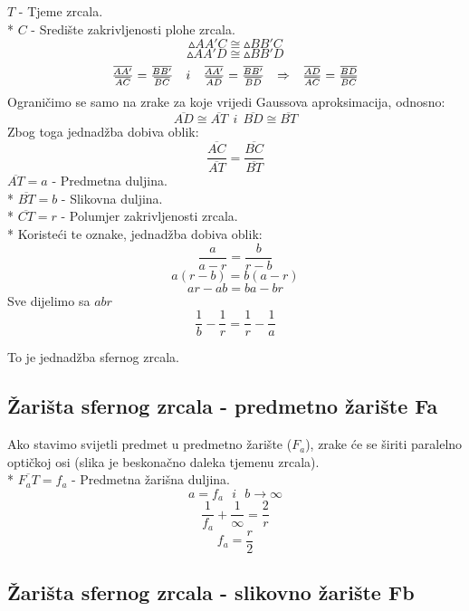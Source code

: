 \documentclass{report}
\begin{document}
{\noindent $T$ - Tjeme zrcala.\\*
$C$ - Središte zakrivljenosti plohe zrcala.
$$\vartriangle AA'C \cong \vartriangle BB'C$$
$$\vartriangle AA'D \cong \vartriangle BB'D$$
$$\begin{array}{*{20}c}
   {\frac{{\overline {AA'} }}
{{\overline {AC} }} = \frac{{\overline {BB'} }}
{{\overline {BC} }}} \hfill & i \hfill & {\frac{{\overline {AA'} }}
{{\overline {AD} }} = \frac{{\overline {BB'} }}
{{\overline {BD} }}} \hfill &  \Rightarrow  \hfill & {\frac{{\overline {AD} }}
{{\overline {AC} }} = \frac{{\overline {BD} }}
{{\overline {BC} }}} \hfill  \\

 \end{array} $$
Ograničimo se samo na zrake za koje vrijedi Gaussova aproksimacija, odnosno:
$$\overline{AD} \cong \overline{AT} \ \ i \ \ \overline{BD} \cong \overline{BT}$$
Zbog toga jednadžba dobiva oblik:
$$\frac{\overline{AC}}{\overline{AT}} = \frac{\overline{BC}}{\overline{BT}}$$
$\overline{AT} = a$ - Predmetna duljina.\\*
$\overline{BT} = b$ - Slikovna duljina.\\*
$\overline{CT} = r$ - Polumjer zakrivljenosti zrcala.\\*
Koristeći te oznake, jednadžba dobiva oblik:
$$\frac{a}{a-r} = \frac{b}{r-b}$$
$$a(r-b) = b(a-r)$$
$$ar - ab = ba - br$$
Sve dijelimo sa $abr$
$$\frac{1}{b} - \frac{1}{r} = \frac{1}{r} - \frac{1}{a}$$
\begin{center}
\end{center}
To je jednadžba sfernog zrcala.

\subsection{Žarišta sfernog zrcala - predmetno žarište Fa}

Ako stavimo svijetli predmet u predmetno žarište ($F_a$), zrake će se širiti paralelno optičkoj osi (slika je beskonačno daleka tjemenu zrcala).\\*
$\overline{F_a T} = f_a$ - Predmetna žarišna duljina.
$$a = f_a \ \ \ i \ \ \ b \to \infty $$
$$\frac{1}{f_a} + \frac{1}{\infty} = \frac{2}{r}$$
$$f_a = \frac{r}{2}$$

\subsection{Žarišta sfernog zrcala - slikovno žarište Fb}

}
\end{document}

